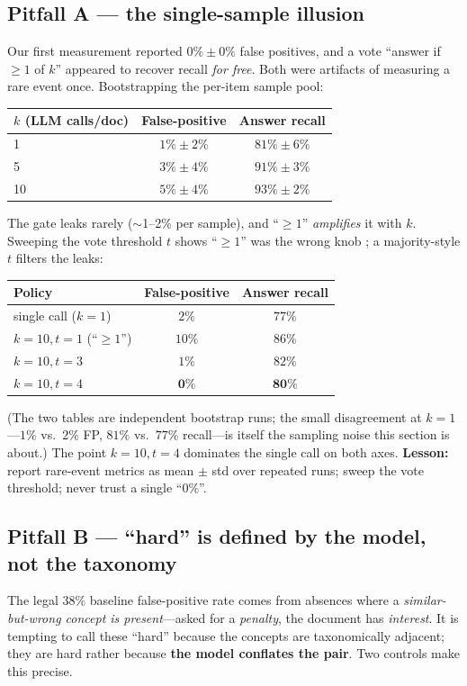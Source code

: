 \documentclass[11pt]{article}
\begin{document}
\subsection{Pitfall A --- the single-sample illusion}
\label{sec:pa}
Our first measurement reported \textbf{$0\% \pm 0\%$} false positives, and a vote
``answer if $\geq 1$ of $k$'' appeared to recover recall \emph{for free}. Both
were artifacts of measuring a rare event once. Bootstrapping the per-item sample
pool:
\begin{table}[h]\centering
\begin{tabular}{lcc}
\toprule
$k$ (LLM calls/doc) & False-positive & Answer recall \\
\midrule
1  & $1\% \pm 2\%$ & $81\% \pm 6\%$ \\
5  & $3\% \pm 4\%$ & $91\% \pm 3\%$ \\
10 & $5\% \pm 4\%$ & $93\% \pm 2\%$ \\
\bottomrule
\end{tabular}
\end{table}
The gate leaks rarely ($\sim$1--2\% per sample), and ``$\geq 1$'' \emph{amplifies}
it with $k$. Sweeping the vote threshold $t$ shows ``$\geq 1$'' was the wrong
knob \cite{wang2023selfconsistency}; a majority-style $t$ filters the leaks:
\begin{table}[h]\centering
\begin{tabular}{lcc}
\toprule
Policy & False-positive & Answer recall \\
\midrule
single call ($k{=}1$)      & $2\%$  & $77\%$ \\
$k{=}10, t{=}1$ (``$\geq 1$'') & $10\%$ & $86\%$ \\
$k{=}10, t{=}3$            & $1\%$  & $82\%$ \\
$k{=}10, t{=}4$           & $\mathbf{0\%}$ & $\mathbf{80\%}$ \\
\bottomrule
\end{tabular}
\end{table}
(The two tables are independent bootstrap runs; the small disagreement at
$k{=}1$---$1\%$ vs.\ $2\%$ FP, $81\%$ vs.\ $77\%$ recall---is itself the sampling
noise this section is about.) The point $k{=}10, t{=}4$ dominates the single call
on both axes. \textbf{Lesson:} report rare-event metrics as mean $\pm$ std over
repeated runs; sweep the vote threshold; never trust a single ``$0\%$''.

\subsection{Pitfall B --- ``hard'' is defined by the model, not the taxonomy}
\label{sec:pb}
The legal $38\%$ baseline false-positive rate comes from absences where a
\emph{similar-but-wrong concept is present}---asked for a \emph{penalty}, the
document has \emph{interest}. It is tempting to call these ``hard'' because the
concepts are taxonomically adjacent; they are hard rather because \textbf{the
model conflates the pair}. Two controls make this precise.
\end{document}
